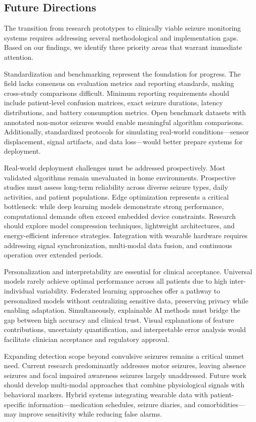 \subsection{Future Directions}

The transition from research prototypes to clinically viable seizure monitoring systems requires addressing several methodological and implementation gaps. Based on our findings, we identify three priority areas that warrant immediate attention.

Standardization and benchmarking represent the foundation for progress. The field lacks consensus on evaluation metrics and reporting standards, making cross-study comparisons difficult. Minimum reporting requirements should include patient-level confusion matrices, exact seizure durations, latency distributions, and battery consumption metrics. Open benchmark datasets with annotated non-motor seizures would enable meaningful algorithm comparisons. Additionally, standardized protocols for simulating real-world conditions---sensor displacement, signal artifacts, and data loss---would better prepare systems for deployment.

Real-world deployment challenges must be addressed prospectively. Most validated algorithms remain unevaluated in home environments. Prospective studies must assess long-term reliability across diverse seizure types, daily activities, and patient populations. Edge optimization represents a critical bottleneck: while deep learning models demonstrate strong performance, computational demands often exceed embedded device constraints. Research should explore model compression techniques, lightweight architectures, and energy-efficient inference strategies. Integration with wearable hardware requires addressing signal synchronization, multi-modal data fusion, and continuous operation over extended periods.

Personalization and interpretability are essential for clinical acceptance. Universal models rarely achieve optimal performance across all patients due to high inter-individual variability. Federated learning approaches offer a pathway to personalized models without centralizing sensitive data, preserving privacy while enabling adaptation. Simultaneously, explainable AI methods must bridge the gap between high accuracy and clinical trust. Visual explanations of feature contributions, uncertainty quantification, and interpretable error analysis would facilitate clinician acceptance and regulatory approval.

Expanding detection scope beyond convulsive seizures remains a critical unmet need. Current research predominantly addresses motor seizures, leaving absence seizures and focal impaired awareness seizures largely unaddressed. Future work should develop multi-modal approaches that combine physiological signals with behavioral markers. Hybrid systems integrating wearable data with patient-specific information---medication schedules, seizure diaries, and comorbidities---may improve sensitivity while reducing false alarms.

